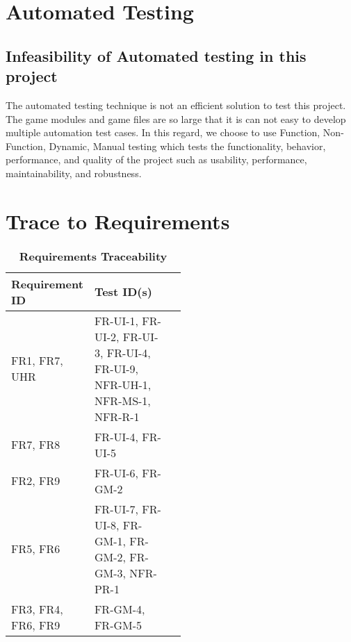 \documentclass[12pt, titlepage]{article}
\begin{document}
\section{Automated Testing}
\subsection{Infeasibility of Automated testing in this project}
The automated testing technique is not an efficient solution to test this project. The game modules and game files are so large that it is can not easy to develop multiple automation test cases. In this regard, we choose to use Function, Non-Function, Dynamic, Manual testing which tests the functionality, behavior, performance, and quality of the project such as usability, performance, maintainability, and robustness. 	
\section{Trace to Requirements}

\begin{table}[H]
\caption{\bf Requirements Traceability}
\begin{tabular}{|l|p{0.5\linewidth}|l|}
\hline
\multicolumn{1}{|l}{\bfseries Requirement ID}  & \multicolumn{1}{l|}{\bfseries Test ID(s)}\\
\hline
FR1, FR7, UHR & FR-UI-1, FR-UI-2, FR-UI-3, FR-UI-4, FR-UI-9, NFR-UH-1, NFR-MS-1, NFR-R-1\\
\hline
FR7, FR8 & FR-UI-4, FR-UI-5 \\
\hline
FR2, FR9 & FR-UI-6, FR-GM-2 \\
\hline
FR5, FR6 & FR-UI-7, FR-UI-8, FR-GM-1, FR-GM-2, FR-GM-3, NFR-PR-1 \\
\hline
FR3, FR4, FR6, FR9 &  FR-GM-4, FR-GM-5\\
\hline
\end{tabular}
\end{table}
\end{document}
